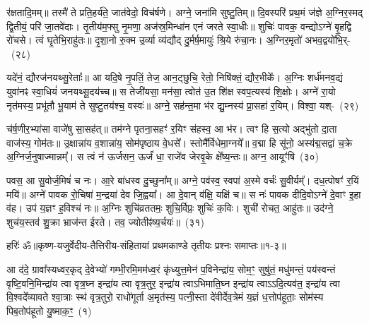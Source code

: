 र॑क्षतादि॒मम्॥ तस्मै॑ ते प्रति॒हर्य॑ते॒ जात॑वेदो॒ विच॑र्\mbox{}षणे। अग्ने॒ जना॑मि सुष्टु॒तिम्॥ दि॒वस्परि॑ प्रथ॒मं ज॑ज्ञे अ॒ग्निर॒स्मद् द्वि॒तीयं॒ परि॑ जा॒तवे॑दाः। तृ॒तीय॑म॒फ्सु नृ॒मणा॒ अज॑स्र॒मिन्धा॑न एनं जरते स्वा॒धीः॥ शुचिः॑ पावक॒ वन्द्यो\-ऽग्ने॑ बृ॒हद्वि रो॑चसे। त्वं घृ॒तेभि॒राहु॑तः॥ दृ॒शा॒नो रु॒क्म उ॒र्व्या व्य॑द्यौद् दु॒र्मर्\mbox{}ष॒मायुः॑ श्रि॒ये रु॑चा॒नः। अ॒ग्निर॒मृतो॑ अभव॒द्वयो॑भि॒र्-~(२८)\ip

यदे॑नं॒ द्यौरज॑नयथ्सु॒रेताः᳚॥ आ यदि॒षे नृ॒पतिं॒ तेज॒ आन॒ट्छुचि॒ रेतो॒ निषि॑क्तं॒ द्यौर॒भीके᳚। अ॒ग्निः शर्ध॑मनव॒द्यं युवा॑नꣴ स्वा॒धियं॑ जनयथ्सू॒दय॑च्च॥ स तेजी॑यसा॒ मन॑सा॒ त्वोत॑ उ॒त शि॑क्ष स्वप॒त्यस्य॑ शि॒क्षोः। अग्ने॑ रा॒यो नृत॑मस्य॒ प्रभू॑तौ भू॒याम॑ ते सुष्टु॒तय॑श्च॒ वस्वः॑॥ अग्ने॒ सह॑न्त॒मा भ॑र द्यु॒म्नस्य॑ प्रा॒सहा॑ र॒यिम्। विश्वा॒ यश्-~(२९)\ip

च॑र्\mbox{}ष॒णीर॒भ्या॑सा वाजे॑षु सा॒सह॑त्॥ तम॑ग्ने पृतना॒सहꣳ॑ र॒यिꣳ स॑हस्व॒ आ भ॑र। त्वꣳ हि स॒त्यो अद्भु॑तो दा॒ता वाज॑स्य॒ गोम॑तः॥ उ॒क्षान्ना॑य व॒शान्ना॑य॒ सोम॑पृष्ठाय वे॒धसे᳚। स्तोमै᳚र्विधेमा॒ग्नये᳚॥ व॒द्मा हि सू॑नो॒ अस्य॑द्म॒सद्वा॑ च॒क्रे अ॒ग्निर्ज॒नुषाज्मान्नम्᳚। स त्वं न॑ ऊर्जसन॒ ऊर्जं॑ धा॒ राजे॑व जेरवृ॒के क्षे᳚ष्य॒न्तः॥ अग्न॒ आयूꣳ॑षि~(३०)\ip

पवस॒ आ सु॒वोर्ज॒मिषं॑ च नः। आ॒रे बा॑धस्व दु॒च्छुना᳚म्॥ अग्ने॒ पव॑स्व॒ स्वपा॑ अ॒स्मे वर्चः॑ सु॒वीर्यम्᳚। दध॒त्पोषꣳ॑ र॒यिं मयि॑॥ अग्ने॑ पावक रो॒चिषा॑ म॒न्द्रया॑ देव जि॒ह्वया᳚। आ दे॒वान् व॑क्षि॒ यक्षि॑ च॥ स नः॑ पावक दीदि॒वो\-ऽग्ने॑ दे॒वाꣳ इ॒हा व॑ह। उप॑ य॒ज्ञꣳ ह॒विश्च॑ नः॥ अ॒ग्निः शुचि॑व्रततमः॒ शुचि॒र्विप्रः॒ शुचिः॑ क॒विः। शुची॑ रोचत॒ आहु॑तः॥ उद॑ग्ने॒ शुच॑य॒स्तव॑ शु॒क्रा भ्राज॑न्त ईरते। तव॒ ज्योतीꣴ॑ष्य॒र्चयः॑॥~(३१)\ip

{\anuvakamend[{पु॒रु॒नि॒ष्ठः पु॑र्वणीक भरा॒\-ऽभि वयो॑भि॒र्य आयूꣳ॑षि॒ विप्रः॒ शुचि॒श्चतु॑र्दश च}]}%

{हरिः॑ ॐ}{॥कृष्ण-यजुर्वेदीय-तैत्तिरीय-संहितायां प्रथमकाण्डे तृतीयः प्रश्नः समाप्तः॥१-३॥}



\setcounter{anuvakam}{0}
आ द॑दे॒ ग्रावा᳚स्यध्वर॒कृद् दे॒वेभ्यो॑ गम्भी॒रमि॒मम॑ध्व॒रं कृ॑ध्युत्त॒मेन॑ प॒विनेन्द्रा॑य॒ सोम॒ꣳ॒ सुषु॑तं॒ मधु॑मन्तं॒ पय॑स्वन्तं वृष्टि॒वनि॒मिन्द्रा॑य त्वा वृत्र॒घ्न इन्द्रा॑य त्वा वृत्र॒तुर॒ इन्द्रा॑य त्वा\-ऽभिमाति॒घ्न इन्द्रा॑य त्वा\-ऽऽ\-दि॒त्यव॑त॒ इन्द्रा॑य त्वा वि॒श्वदे᳚व्यावते श्वा॒त्राः स्थ॑ वृत्र॒तुरो॒ राधो॑गूर्ता अ॒मृत॑स्य॒ पत्नी॒स्ता दे॑वीर्देव॒त्रेमं य॒ज्ञं ध॒त्तोप॑हूताः॒ सोम॑स्य पिब॒तोप॑हूतो यु॒ष्माक॒ꣳ॒~(१)\ip

